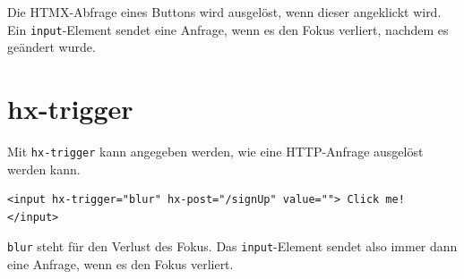 \documentclass[a4paper]{scrartcl}
\begin{document}
Die HTMX-Abfrage eines Buttons wird ausgelöst, wenn dieser angeklickt wird.
Ein \texttt{input}-Element sendet eine Anfrage, wenn es den Fokus verliert, nachdem es geändert wurde.


\section{hx-trigger}
Mit \texttt{hx-trigger} kann angegeben werden, wie eine HTTP-Anfrage ausgelöst werden kann. 


\begin{verbatim}
<input hx-trigger="blur" hx-post="/signUp" value=""> Click me! </input>
\end{verbatim}

\texttt{blur} steht für den Verlust des Fokus.
Das \texttt{input}-Element sendet also immer dann eine Anfrage, wenn es den Fokus verliert.
\end{document}
